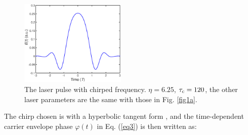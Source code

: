 \documentclass[10pt,letterpaper]{article}
\begin{document}
\begin{figure}[!htbp]
	\centering
	\includegraphics[width=0.45\textwidth]{fig3}
	\caption{The laser pulse with chirped frequency. $ \eta=6.25 $, $ \tau_{\rm{c}}=120 $, the other laser parameters are the same with those in Fig. \ref{fig1a}.}
	\label{fig3}
\end{figure}

The chirp chosen is with a hyperbolic tangent form \cite{Carrera-Chirp-PRA-2007}, and the time-dependent carrier envelope phase $ \varphi(t) $ in Eq. (\ref{eq3}) is then written as:
\end{document}
